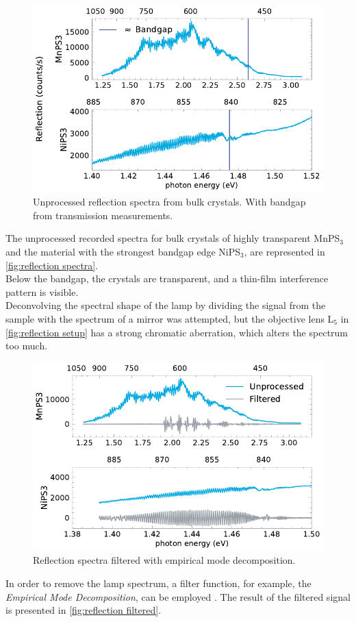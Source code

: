 \documentclass[
	oneside,
	parskip=half,
	a4paper,
]{scrbook}
\begin{document}
\begin{figure}
	\centering
	\includegraphics{../figures/2024-03-14 reflection spectra.pdf}
	\caption{Unprocessed reflection spectra from bulk crystals. With bandgap from transmission measurements.}
	\label{fig:reflection spectra}
\end{figure}
The unprocessed recorded spectra for bulk crystals of highly transparent MnPS$_3$ and the material with the strongest bandgap edge NiPS$_3$, are represented in \autoref{fig:reflection spectra}.\\
Below the bandgap, the crystals are transparent, and a thin-film interference pattern is visible.\\
Deconvolving the spectral shape of the lamp by dividing the signal from the sample with the spectrum of a mirror was attempted, but the objective lens L$_5$ in \autoref{fig:reflection setup} has a strong chromatic aberration, which alters the spectrum too much.

\begin{figure}
	\centering
	\includegraphics{../figures/2024-03-14 reflection spectra IMF.pdf}
	\caption{Reflection spectra filtered with empirical mode decomposition.}
	\label{fig:reflection filtered}
\end{figure}
In order to remove the lamp spectrum, a filter function, for example, the \textit{Empirical Mode Decomposition}, can be employed \cite{thickness}.
The result of the filtered signal is presented in \autoref{fig:reflection filtered}.
\end{document}
